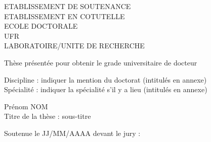 \documentclass{amu_these}
\begin{document}
\titlepage
{}\selectfont{}
\vspace*{-2cm}
\begin{center}
	\begin{minipage}[c]{0.70\linewidth}
	\end{minipage}\hfill
	\begin{minipage}[c]{0.30\linewidth}
	\end{minipage}\hfill 
\end{center}
\begin{flushleft}
	\vspace{0.2cm}
	\LARGE ETABLISSEMENT DE SOUTENANCE\\
	\LARGE\textcolor{black!50}{ETABLISSEMENT EN COTUTELLE}\\
	\Large ECOLE DOCTORALE\\
	\vspace{0.2cm}
	\normalsize UFR\\
	\vspace{0.2cm}
	LABORATOIRE/UNITE DE RECHERCHE\\
    \begin{center}
		\vspace{2cm}
		Thèse présentée pour obtenir le grade universitaire de docteur\\
    \end{center}
	\vspace{0.5cm}
    Discipline : indiquer la mention du doctorat (intitulés en annexe)\\
    Spécialité : indiquer la spécialité s'il y a lieu (intitulés en annexe)\\
    \begin{center}
        \vspace{0.5cm}
        \Large Prénom NOM\\
        \vspace{1cm}
        \large Titre de la thèse : sous-titre\\
    \end{center}
	\vspace{3.5cm}
    \normalsize Soutenue le JJ/MM/AAAA devant le jury :\\
\end{flushleft}
\vspace{0.4cm}
\end{document}
